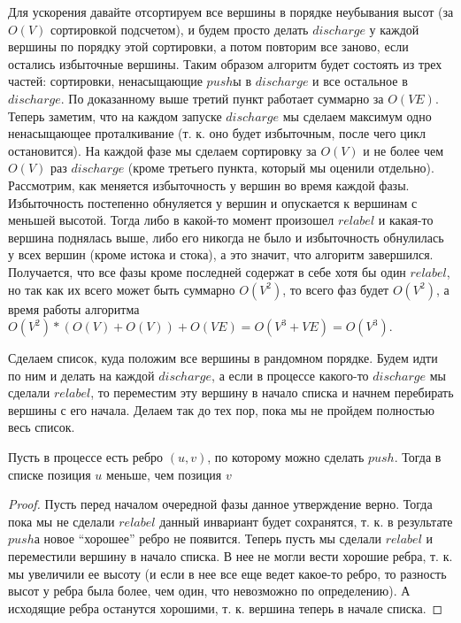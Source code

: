 \begin{algorithm}
    Для ускорения давайте отсортируем все вершины в порядке неубывания высот (за $O(V)$ сортировкой подсчетом), и будем просто делать $discharge$ у каждой вершины по порядку этой сортировки, а потом повторим все заново, если остались избыточные вершины. Таким образом алгоритм будет состоять из трех частей: сортировки, ненасыщающие $push$ы в $discharge$ и все остальное в $discharge$. По доказанному выше третий пункт работает суммарно за $O(VE)$. Теперь заметим, что на каждом запуске $discharge$ мы сделаем максимум одно ненасыщающее проталкивание (т. к. оно будет избыточным, после чего цикл остановится). На каждой фазе мы сделаем сортировку за $O(V)$ и не более чем $O(V)$ раз $discharge$ (кроме третьего пункта, который мы оценили отдельно). Рассмотрим, как меняется избыточность у вершин во время каждой фазы. Избыточность постепенно обнуляется у вершин и опускается к вершинам с меньшей высотой. Тогда либо в какой-то момент произошел $relabel$ и какая-то вершина поднялась выше, либо его никогда не было и избыточность обнулилась у всех вершин (кроме истока и стока), а это значит, что алгоритм завершился. Получается, что все фазы кроме последней содержат в себе хотя бы один $relabel$, но так как их всего может быть суммарно $O(V^2)$, то всего фаз будет $O(V^2)$, а время работы алгоритма $O(V^2) * (O(V) + O(V)) + O(VE) = O(V^3 + VE) = O(V^3)$.
\end{algorithm}

\begin{algorithm}
    Сделаем список, куда положим все вершины в рандомном порядке. Будем идти по ним и делать на каждой $discharge$, а если в процессе какого-то $discharge$ мы сделали $relabel$, то переместим эту вершину в начало списка и начнем перебирать вершины с его начала. Делаем так до тех пор, пока мы не пройдем полностью весь список.

    \begin{lemma}
        Пусть в процессе есть ребро $(u, v)$, по которому можно сделать $push$. Тогда в списке позиция $u$ меньше, чем позиция $v$
    \end{lemma}

    \begin{proof}
        Пусть перед началом очередной фазы данное утверждение верно. Тогда пока мы не сделали $relabel$ данный инвариант будет сохранятся, т. к. в результате $push$а новое ``хорошее'' ребро не появится. Теперь пусть мы сделали $relabel$ и переместили вершину в начало списка. В нее не могли вести хорошие ребра, т. к. мы увеличили ее высоту (и если в нее все еще ведет какое-то ребро, то разность высот у ребра была более, чем один, что невозможно по определению). А исходящие ребра останутся хорошими, т. к. вершина теперь в начале списка.
    \end{proof}
\end{algorithm}


